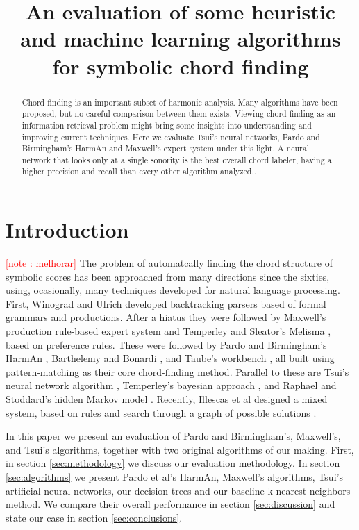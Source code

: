 \documentclass{article}
\title{An evaluation of some heuristic and machine learning algorithms for
  symbolic chord finding} \oneauthor {}{}
\newcounter{notecounter}
\newcommand{\note}[1]{
  \addtocounter{notecounter}{1}
  \textcolor{red}{[note \arabic{notecounter}: #1]}
}
\begin{document}
\graphicspath{{figs/}{data/}}
\maketitle

\begin{abstract}
  Chord finding is an important subset of harmonic analysis. Many
  algorithms have been proposed, but no careful comparison between
  them exists. Viewing chord finding as an information retrieval
  problem might bring some insights into understanding and improving
  current techniques. Here we evaluate Tsui's neural networks, Pardo
  and Birmingham's HarmAn and Maxwell's expert system under this
  light. A neural network that looks only at a single sonority is the
  best overall chord labeler, having a higher precision and recall
  than every other algorithm analyzed..
\end{abstract}

\section{Introduction}
\label{sec:introduction}

\note{melhorar} The problem of automatcally finding the chord
structure of symbolic scores has been approached from many directions
since the sixties, using, ocasionally, many techniques developed for
natural language processing. First, Winograd
\cite{winograd:linguistics} and Ulrich \cite{ulrich:analysis}
developed backtracking parsers based of formal grammars and
productions. After a hiatus they were followed by Maxwell's
\cite{maxwell:expert} production rule-based expert system and
Temperley and Sleator's Melisma \cite{temperley.ea:modeling}, based on
preference rules.  These were followed by Pardo and Birmingham's
HarmAn \cite{pardo.ea:algorithms}, Barthelemy and Bonardi
\cite{barthelemy.ea:figured}, and Taube's workbench
\cite{taube:automatic}, all built using pattern-matching as their core
chord-finding method. Parallel to these are Tsui's neural network
algorithm \cite{tsui:harmonic}, Temperley's bayesian approach
\cite{temperley:bayesian}, and Raphael and Stoddard's hidden Markov
model \cite{raphael.ea:harmonic}. Recently, Illescas et al designed a
mixed system, based on rules and search through a graph of possible
solutions \cite{illescas.ea:harmonic}.

In this paper we present an evaluation of Pardo and Birmingham's,
Maxwell's, and Tsui's algorithms, together with two original
algorithms of our making.  First, in section \ref{sec:methodology} we
discuss our evaluation methodology. In section \ref{sec:algorithms} we
present Pardo et al's HarmAn, Maxwell's algorithms, Tsui's artificial
neural networks, our decision trees and our baseline
k-nearest-neighbors method. We compare their overall performance in
section \ref{sec:discussion} and state our case in section
\ref{sec:conclusions}.
\end{document}
